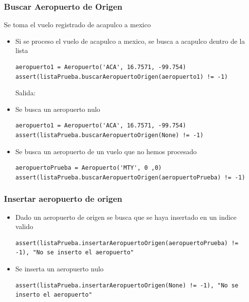 \documentclass[12pt]{article}
\begin{document}
\subsubsection{Buscar Aeropuerto de Origen}
Se toma el vuelo registrado de acapulco a mexico
\begin{itemize}
\item Si se proceso el vuelo de acapulco a mexico, se busca a acapulco dentro de la lista
\begin{verbatim}
aeropuerto1 = Aeropuerto('ACA', 16.7571, -99.754)
assert(listaPrueba.buscarAeropuertoOrigen(aeropuerto1) != -1)    
\end{verbatim}
  Salida:
\item Se busca un aeropuerto nulo
\begin{verbatim}
aeropuerto1 = Aeropuerto('ACA', 16.7571, -99.754)
assert(listaPrueba.buscarAeropuertoOrigen(None) != -1)    
\end{verbatim}
\item Se busca un aeropuerto de un vuelo que no hemos procesado
\begin{verbatim}
aeropuertoPrueba = Aeropuerto('MTY', 0 ,0)
assert(listaPrueba.buscarAeropuertoOrigen(aeropuertoPrueba) != -1)    
\end{verbatim}
\end{itemize}
\subsubsection{Insertar aeropuerto de origen}
\begin{itemize}
\item Dado un aeropuerto de origen se busca que se haya insertado en un indice valido
\begin{verbatim}
assert(listaPrueba.insertarAeropuertoOrigen(aeropuertoPrueba) != -1), "No se inserto el aeropuerto"
\end{verbatim}
\item Se inserta un aeropuerto nulo
\begin{verbatim}
assert(listaPrueba.insertarAeropuertoOrigen(None) != -1), "No se inserto el aeropuerto"
\end{verbatim}
\end{itemize}
\end{document}
